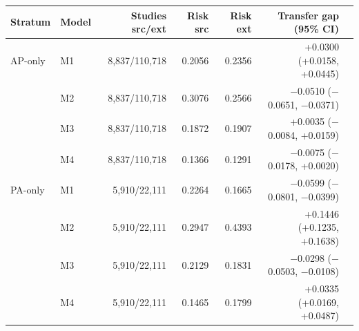 \begin{tabular}{llrrrrr}
\toprule
Stratum & Model & Studies src/ext & Risk src & Risk ext & Transfer gap (95\% CI)\\
\midrule
AP-only & M1 & 8,837/110,718 & 0.2056 & 0.2356 & +0.0300 (+0.0158, +0.0445)\\
 & M2 & 8,837/110,718 & 0.3076 & 0.2566 & $-$0.0510 ($-$0.0651, $-$0.0371)\\
 & M3 & 8,837/110,718 & 0.1872 & 0.1907 & +0.0035 ($-$0.0084, +0.0159)\\
 & M4 & 8,837/110,718 & 0.1366 & 0.1291 & $-$0.0075 ($-$0.0178, +0.0020)\\
\addlinespace
PA-only & M1 & 5,910/22,111 & 0.2264 & 0.1665 & $-$0.0599 ($-$0.0801, $-$0.0399)\\
 & M2 & 5,910/22,111 & 0.2947 & 0.4393 & +0.1446 (+0.1235, +0.1638)\\
 & M3 & 5,910/22,111 & 0.2129 & 0.1831 & $-$0.0298 ($-$0.0503, $-$0.0108)\\
 & M4 & 5,910/22,111 & 0.1465 & 0.1799 & +0.0335 (+0.0169, +0.0487)\\
\bottomrule
\end{tabular}
